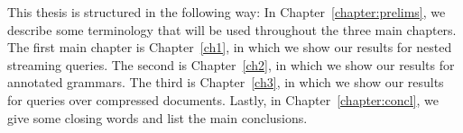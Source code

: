 This thesis is structured in the following way:
In Chapter~\ref{chapter:prelims}, we describe some terminology that will be used throughout the three main chapters.
The first main chapter is Chapter~\ref{ch1}, in which we show our results for nested streaming queries. 
The second is Chapter~\ref{ch2}, in which we show our results for annotated grammars. 
The third is Chapter~\ref{ch3}, in which we show our results for queries over compressed documents.
Lastly, in Chapter~\ref{chapter:concl}, we give some closing words and list the main conclusions.